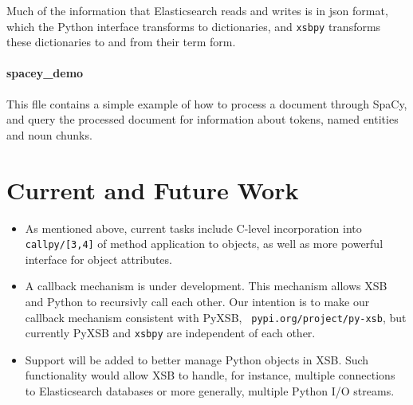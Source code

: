 Much of the information that Elasticsearch reads and writes is in json
format, which the Python interface transforms to dictionaries, and
{\tt xsbpy} transforms these dictionaries to and from their term form.

\paragraph{spacey\_demo}
This flle contains a simple example of how to process a document
through SpaCy, and query the processed document for
information about tokens, named entities and noun chunks.


\section{Current and Future Work}

\begin{itemize}
\item As mentioned above, current tasks include C-level incorporation
  into {\tt callpy/[3,4]} of method application to objects, as well as
  more powerful interface for object attributes.

\item A callback mechanism is under development.  This mechanism
  allows XSB and Python to recursivly call each other.  Our intention
  is to make our callback mechanism consistent with PyXSB, {\tt
    pypi.org/project/py-xsb}, but currently PyXSB and {\tt xsbpy} are
  independent of each other.

\item Support will be added to better manage Python objects in XSB.
  Such functionality would allow XSB to handle, for instance, multiple
  connections to Elasticsearch databases or more generally, multiple
  Python I/O streams.

\end{itemize}  
